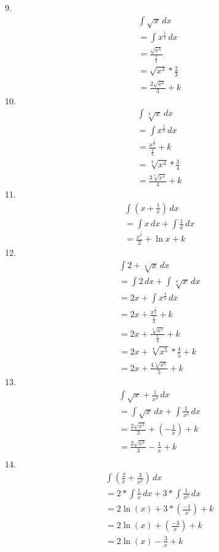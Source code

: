 \documentclass{article}
\begin{document}
9.
\begin{gather*}
    \int \sqrt{x} \,dx
\\
    = \int x^\frac{1}{2} \,dx
\\
    = \frac{ \sqrt{x^3}}{\frac{3}{2}}
\\
    = \sqrt{x^3} * {\frac{2}{3}}
\\
    = \frac{2\sqrt{x^3}}{3} + k
\end{gather*}
10.
\begin{gather*}
    \int \sqrt[3]{x} \,dx
\\
    = \int x^\frac{1}{3} \,dx
\\
    = \frac{x^\frac{4}{3}}{\frac{4}{3}} + k
\\
    = \sqrt[3]{x^4} * \frac{3}{4}
\\
    = \frac{3\sqrt[3]{x^4}}{4} + k
\end{gather*}
11.
\begin{gather*}
    \int (x + \frac{1}{x}) \,dx
\\
    = \int x \,dx + \int \frac{1}{x} \,dx
\\
    = \frac{x^2}{2} + \ln x + k
\end{gather*}
12.
\begin{gather*}
    \int 2 + \sqrt[4]{x} \,dx
\\
    = \int 2 \,dx + \int \sqrt[4]{x} \,dx
\\
    = 2x + \int x^\frac{1}{4} \,dx
\\
    = 2x + \frac{x^\frac{1}{4}}{\frac{5}{4}} + k
\\
    = 2x + \frac{\sqrt[4]{x^5}}{\frac{5}{4}} + k
\\
    = 2x + \sqrt[4]{x^5} * \frac{4}{5} + k
\\
    = 2x + \frac{4\sqrt[4]{x^5}}{5} + k
\end{gather*}
13.
\begin{gather*}
    \int \sqrt{x} + \frac{1}{x^2} \,dx
\\
    = \int \sqrt{x} \,dx + \int \frac{1}{x^2} \,dx
\\
    = \frac{2\sqrt{x^3}}{3} + (-\frac{1}{x}) + k
\\
    = \frac{2\sqrt{x^3}}{3} - \frac{1}{x} + k
\\
\end{gather*}
14.
\begin{gather*}
    \int (\frac{2}{x} + \frac{3}{x^2}) \,dx
\\
    = 2 * \int \frac{1}{x} \,dx + 3 * \int \frac{1}{x^2} \,dx
\\
    = 2 \ln(x) + 3 * (\frac{-1}{x}) + k
\\
    = 2 \ln(x) + (\frac{-3}{x}) + k
\\
    = 2 \ln(x) - \frac{3}{x} + k
\\
\end{gather*}
\end{document}

